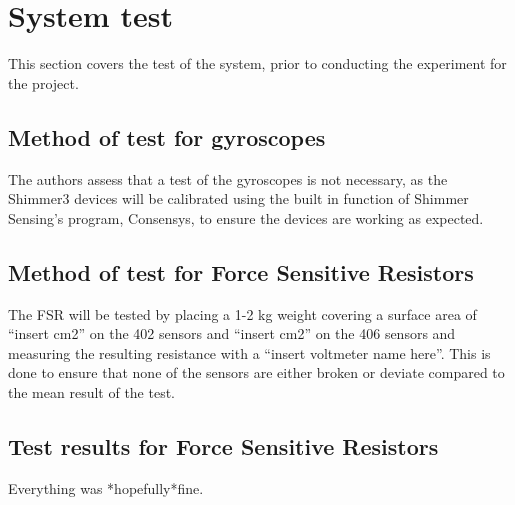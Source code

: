 \section{System test}
This section covers the test of the system, prior to conducting the experiment for the project. 

\subsection{Method of test for gyroscopes}
The authors assess that a test of the gyroscopes is not necessary, as the Shimmer3 devices will be calibrated using the built in function of Shimmer Sensing’s program, Consensys, to ensure the devices are working as expected.



\subsection{Method of test for Force Sensitive Resistors}
The FSR will be tested by placing a 1-2 kg weight covering a surface area of “insert cm2” on the 402 sensors and “insert cm2” on the 406 sensors and measuring the resulting resistance with a “insert voltmeter name here”. This is done to ensure that none of the sensors are either broken or deviate compared to the mean result of the test. 


\subsection{Test  results for Force Sensitive Resistors}

Everything was *hopefully*fine. 




